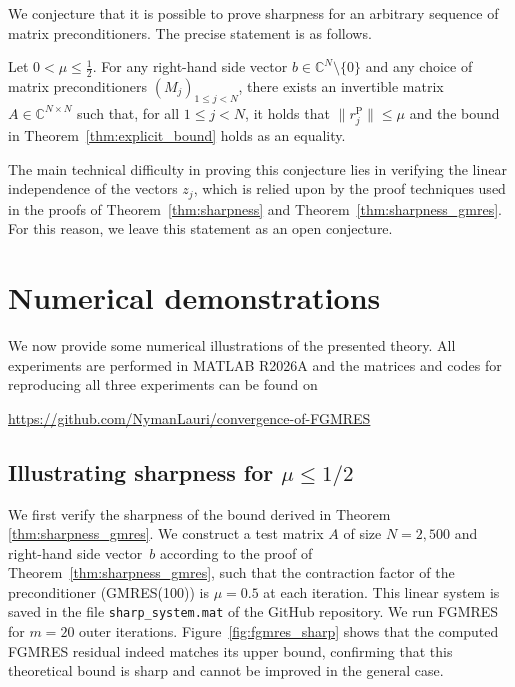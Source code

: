 \documentclass{siamart251216}
\def\C{\mathbb{C}}
\begin{document}
{We conjecture that it is possible to prove sharpness for an arbitrary sequence of matrix preconditioners. The precise statement is as follows.

\begin{conjecture}
    Let $0 < \mu \leq \frac{1}{2}$. For any right-hand side vector $b \in \C^N \setminus \{0\}$ and any choice of matrix preconditioners $(M_j)_{1\leq j < N}$, there exists an invertible matrix $A \in \C^{N \times N}$ such that, for all $1 \leq j < N$, it holds that $\|r_j^{\mathrm{P}}\| \leq \mu$ and the bound in Theorem~\ref{thm:explicit_bound} holds as an equality.
\end{conjecture}

The main technical difficulty in proving this conjecture lies in verifying the linear independence of the vectors $z_j$, which is relied upon by the proof techniques used in the proofs of Theorem~\ref{thm:sharpness} and Theorem~\ref{thm:sharpness_gmres}. For this reason, we leave this statement as an open conjecture.


\section{Numerical demonstrations}\label{sec:numex}

We now provide some numerical illustrations of the presented theory. All experiments are performed in MATLAB R2026A and the matrices and codes for reproducing all three experiments can be found on
\smallskip
\begin{center}
\url{https://github.com/NymanLauri/convergence-of-FGMRES}
\end{center}

\subsection{Illustrating sharpness for $\mu\leq 1/2$}
We first verify the sharpness of the bound derived in Theorem \ref{thm:sharpness_gmres}. We construct a test matrix $A$ of size $N=2,500$ and right-hand side vector~$b$ according to the proof of Theorem~\ref{thm:sharpness_gmres}, such that the contraction factor of the preconditioner (GMRES(100)) is $\mu = 0.5$ at each iteration. This linear system is saved in the file \texttt{sharp\_system.mat} of the GitHub repository. We run FGMRES for $m=20$ outer iterations.
Figure~\ref{fig:fgmres_sharp} shows that the computed FGMRES residual indeed matches its upper bound, confirming that this theoretical bound is sharp and cannot be improved in the general case.

}
\end{document}
